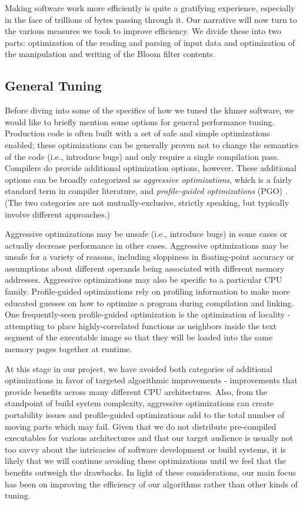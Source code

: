 \documentclass{article}
\begin{document}
Making software work more efficiently is quite a gratifying experience,
especially in the face of trillions of bytes passing through it. Our narrative
will now turn to the various measures we took to improve efficiency. We
divide these into two parts: optimization of the reading and parsing of input
data and optimization of the manipulation and writing of the Bloom filter
contents.

\subsection{General Tuning}

Before diving into some of the specifics of how we tuned the khmer software, we
would like to briefly mention some options for general performance tuning.
Production code is often built with a set of safe and simple optimizations
enabled; these optimizations can be generally proven not to change the
semantics of the code (i.e., introduce bugs) and only require a single
compilation pass. Compilers do provide additional optimization options,
however. These additional options can be broadly categorized as
\textit{aggressive optimizations}, which is a fairly standard term in compiler
literature, and \textit{profile-guided optimizations} (PGO) \citep{web:PGO}.
(The two categories are not mutually-exclusive, strictly speaking, but
typically involve different approaches.)

Aggressive optimizations may be unsafe (i.e., introduce bugs) in some cases or
actually decrease performance in other cases. Aggressive optimizations may be
unsafe for a variety of reasons, including sloppiness in floating-point
accuracy or assumptions about different operands being associated with
different memory addresses. Aggressive optimizations may also be specific to a
particular CPU family. Profile-guided optimizations rely on profiling
information to make more educated guesses on how to optimize a program during
compilation and linking.  One frequently-seen profile-guided optimization is
the optimization of locality - attempting to place highly-correlated functions
as neighbors inside the text segment of the executable image so that they will
be loaded into the same memory pages together at runtime.

At this stage in our project, we have avoided both categories of additional
optimizations in favor of targeted algorithmic improvements - improvements that
provide benefits across many different CPU architectures.  Also, from the
standpoint of build system complexity, aggressive optimizations can create
portability issues and profile-guided optimizations add to the total number of
moving parts which may fail. Given that we do not distribute pre-compiled
executables for various architectures and that our target audience is usually
not too savvy about the intricacies of software development or build systems,
it is likely that we will continue avoiding these optimizations until we feel
that the benefits outweigh the drawbacks. In light of these considerations, our
main focus has been on improving the efficiency of our algorithms rather than
other kinds of tuning.
\end{document}
